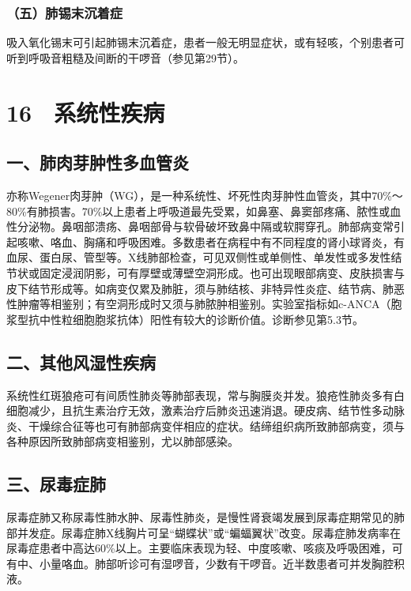 \subsubsection{（五）肺锡末沉着症}

吸入氧化锡末可引起肺锡末沉着症，患者一般无明显症状，或有轻咳，个别患者可听到呼吸音粗糙及间断的干啰音（参见第29节）。

\protect\hypertarget{text00066.html}{}{}

\section{16　系统性疾病}

\subsection{一、肺肉芽肿性多血管炎}

亦称Wegener肉芽肿（WG），是一种系统性、坏死性肉芽肿性血管炎，其中70\%～80\%有肺损害。70\%以上患者上呼吸道最先受累，如鼻塞、鼻窦部疼痛、脓性或血性分泌物。鼻咽部溃疡、鼻咽部骨与软骨破坏致鼻中隔或软腭穿孔。肺部病变常引起咳嗽、咯血、胸痛和呼吸困难。多数患者在病程中有不同程度的肾小球肾炎，有血尿、蛋白尿、管型等。X线肺部检查，可见双侧性或单侧性、单发性或多发性结节状或固定浸润阴影，可有厚壁或薄壁空洞形成。也可出现眼部病变、皮肤损害与皮下结节形成等。如病变仅累及肺脏，须与肺结核、非特异性炎症、结节病、肺恶性肿瘤等相鉴别；有空洞形成时又须与肺脓肿相鉴别。实验室指标如c-ANCA（胞浆型抗中性粒细胞胞浆抗体）阳性有较大的诊断价值。诊断参见第5.3节。

\subsection{二、其他风湿性疾病}

系统性红斑狼疮可有间质性肺炎等肺部表现，常与胸膜炎并发。狼疮性肺炎多有白细胞减少，且抗生素治疗无效，激素治疗后肺炎迅速消退。硬皮病、结节性多动脉炎、干燥综合征等也可有肺部病变伴相应的症状。结缔组织病所致肺部病变，须与各种原因所致肺部病变相鉴别，尤以肺部感染。

\subsection{三、尿毒症肺}

尿毒症肺又称尿毒性肺水肿、尿毒性肺炎，是慢性肾衰竭发展到尿毒症期常见的肺部并发症。尿毒症肺X线胸片可呈“蝴蝶状”或“蝙蝠翼状”改变。尿毒症肺发病率在尿毒症患者中高达60\%以上。主要临床表现为轻、中度咳嗽、咳痰及呼吸困难，可有中、小量咯血。肺部听诊可有湿啰音，少数有干啰音。近半数患者可并发胸腔积液。

